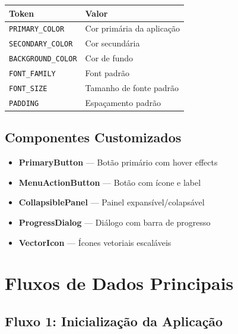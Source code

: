 \documentclass[12pt,a4paper]{article}
\begin{document}
    \begin{table}[h]
        \centering
        \begin{tabular}{|l|l|}
            \hline
            \textbf{Token} & \textbf{Valor} \\
            \hline
            \texttt{PRIMARY\_COLOR} & Cor primária da aplicação \\
            \hline
            \texttt{SECONDARY\_COLOR} & Cor secundária \\
            \hline
            \texttt{BACKGROUND\_COLOR} & Cor de fundo \\
            \hline
            \texttt{FONT\_FAMILY} & Font padrão \\
            \hline
            \texttt{FONT\_SIZE} & Tamanho de fonte padrão \\
            \hline
            \texttt{PADDING} & Espaçamento padrão \\
            \hline
        \end{tabular}
    \end{table}

    \subsection{Componentes Customizados}

    \begin{itemize}
        \item \textbf{PrimaryButton} — Botão primário com hover effects
        \item \textbf{MenuActionButton} — Botão com ícone e label
        \item \textbf{CollapsiblePanel} — Painel expansível/colapsável
        \item \textbf{ProgressDialog} — Diálogo com barra de progresso
        \item \textbf{VectorIcon} — Ícones vetoriais escaláveis
    \end{itemize}

    \newpage

    \section{Fluxos de Dados Principais}

    \subsection{Fluxo 1: Inicialização da Aplicação}
\end{document}
